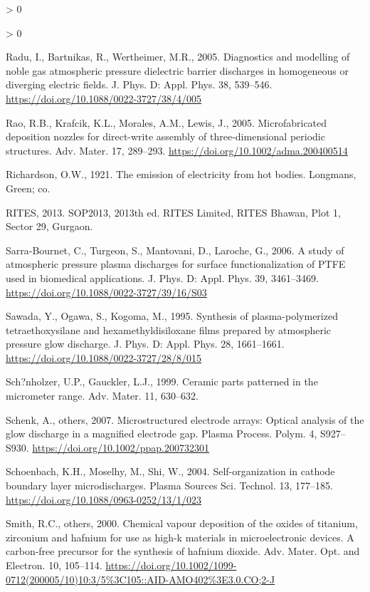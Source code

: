 \documentclass[
  11pt,
  twoside]{article}
\newlength{\cslhangindent}
\newenvironment{CSLReferences}[2] %
 {%
  \setlength{\parindent}{0pt}
  \ifodd #1 \everypar{\setlength{\hangindent}{\cslhangindent}}\ignorespaces\fi
  \ifnum #2 > 0
  \setlength{\parskip}{#2\baselineskip}
  \fi
 }%
 {}
\begin{document}
\begin{CSLReferences}{1}{0}
\begin{CSLReferences}{1}{0}
\leavevmode\hypertarget{ref-Radu05}{}%
Radu, I., Bartnikas, R., Wertheimer, M.R., 2005. Diagnostics and modelling of noble gas atmospheric pressure dielectric barrier discharges in homogeneous or diverging electric fields. J. Phys. D: Appl. Phys. 38, 539--546. \url{https://doi.org/10.1088/0022-3727/38/4/005}

\leavevmode\hypertarget{ref-Rao05}{}%
Rao, R.B., Krafcik, K.L., Morales, A.M., Lewis, J., 2005. Microfabricated deposition nozzles for direct-write assembly of three-dimensional periodic structures. Adv. Mater. 17, 289--293. \url{https://doi.org/10.1002/adma.200400514}

\leavevmode\hypertarget{ref-Rich1921}{}%
Richardson, O.W., 1921. The emission of electricity from hot bodies. Longmans, Green; co.

\leavevmode\hypertarget{ref-SOP2013RITES}{}%
RITES, 2013. SOP2013, 2013th ed. RITES Limited, RITES Bhawan, Plot 1, Sector 29, Gurgaon.

\leavevmode\hypertarget{ref-Sarr06}{}%
Sarra-Bournet, C., Turgeon, S., Mantovani, D., Laroche, G., 2006. A study of atmospheric pressure plasma discharges for surface functionalization of {PTFE} used in biomedical applications. J. Phys. D: Appl. Phys. 39, 3461--3469. \url{https://doi.org/10.1088/0022-3727/39/16/S03}

\leavevmode\hypertarget{ref-Sawa1995}{}%
Sawada, Y., Ogawa, S., Kogoma, M., 1995. Synthesis of plasma-polymerized tetraethoxysilane and hexamethyldisiloxane films prepared by atmospheric pressure glow discharge. J. Phys. D: Appl. Phys. 28, 1661--1661. \url{https://doi.org/10.1088/0022-3727/28/8/015}

\leavevmode\hypertarget{ref-Scho1999}{}%
Sch?nholzer, U.P., Gauckler, L.J., 1999. Ceramic parts patterned in the micrometer range. Adv. Mater. 11, 630--632.

\leavevmode\hypertarget{ref-Sche07}{}%
Schenk, A., others, 2007. Microstructured electrode arrays: Optical analysis of the glow discharge in a magnified electrode gap. Plasma Process. Polym. 4, S927--S930. \url{https://doi.org/10.1002/ppap.200732301}

\leavevmode\hypertarget{ref-Scho04}{}%
Schoenbach, K.H., Moselhy, M., Shi, W., 2004. Self-organization in cathode boundary layer microdischarges. Plasma Sources Sci. Technol. 13, 177--185. \url{https://doi.org/10.1088/0963-0252/13/1/023}

\leavevmode\hypertarget{ref-Smit00}{}%
Smith, R.C., others, 2000. Chemical vapour deposition of the oxides of titanium, zirconium and hafnium for use as high-k materials in microelectronic devices. A carbon-free precursor for the synthesis of hafnium dioxide. Adv. Mater. Opt. and Electron. 10, 105--114. \url{https://doi.org/10.1002/1099-0712(200005/10)10:3/5\%3C105::AID-AMO402\%3E3.0.CO;2-J}


\end{CSLReferences}
\end{CSLReferences}
\end{document}
